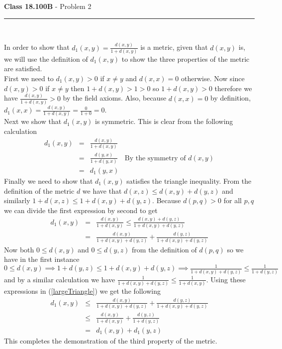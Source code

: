 \documentclass[11pt,reqno]{article}
\begin{document}
\newpage
\vspace{15pt}
\begin{flushleft} 
\textbf{Class 18.100B} - Problem 2\\
\rule{500pt}{1pt}\\
\end{flushleft} 

In order to show that $d_1(x,y) = \frac{d(x,y)}{1 + d(x,y)}$ is a metric, given that $d(x,y)$ is, we will use the definition of $d_1(x,y)$ to show the three properties of the metric are satisfied.\\
\indent First we need to $d_1(x,y) > 0$ if $x \neq y$ and $d(x,x) = 0$ otherwise. Now since $d(x,y) > 0$ if $x \neq y$ then $1 + d(x,y) > 1 > 0$ so $1+ d(x,y) > 0$ therefore we have $\frac{d(x,y)}{1 + d(x,y)} > 0$ by the field axioms. Also, because $d(x,x) = 0$ by definition, $d_1(x,x) = \frac{d(x,y)}{1 + d(x,y)} = \frac{0}{1 + 0} = 0$.\\
\indent Next we show that $d_1(x,y)$ is symmetric. This is clear from the following calculation
\begin{eqnarray*}
d_1(x,y) & = & \frac{d(x,y)}{1 + d(x,y)} \\
	      & = & \frac{d(y,x)}{1 + d(y,x)} \quad \text{By the symmetry of $d(x,y)$} \\
	      & = & d_1(y,x)
\end{eqnarray*}
Finally we need to show that $d_1(x,y)$ satisfies the triangle inequality. From the definition of the metric $d$ we have that $d(x,z) \le d(x,y) + d(y,z)$ and similarly $1+ d(x,z) \le 1+ d(x,y) + d(y,z)$. Because $d(p,q) > 0$ for all $p, q$we can divide the first expression by second to get\\
\begin{eqnarray}
d_1(x,y) & = & \frac{d(x,y)}{1 + d(x,y)} \le \frac{d(x,y)+ d(y,z)}{1+ d(x,y) + d(y,z)} \nonumber \\ 
	      & = & \frac{d(x,y)}{1+ d(x,y) + d(y,z)} + \frac{d(y,z)}{1+ d(x,y) + d(y,z)} \label{largeTriangle}
\end{eqnarray}
Now both $0 \le d(x,y)$ and $0 \le d(y,z)$ from the definition of $d(p,q)$ so we have in the first instance  $0 \le d(x,y) \implies 1 + d(y,z) \le 1 + d(x,y) + d(y,z) \implies \frac{1}{1 + d(x,y) + d(y,z)} \le \frac{1}{1 + d(y,z)}$ and by a similar calculation we have $ \frac{1}{1 + d(x,y) + d(y,z)} \le \frac{1}{1 + d(x,y)}$. Using these expressions in (\ref{largeTriangle}) we get the following 
\begin{eqnarray*}
d_1(x,y) & \le & \frac{d(x,y)}{1+ d(x,y) + d(y,z)} + \frac{d(y,z)}{1+ d(x,y) + d(y,z)}  \\
	      & \le  &  \frac{d(x,y)}{1+ d(x,y)} +  \frac{d(y,z)}{1+ d(y,z)} \\
	      & = & d_1(x,y) + d_1(y,z)
\end{eqnarray*}
This completes the demonstration of the third property of the metric.
\end{document}
